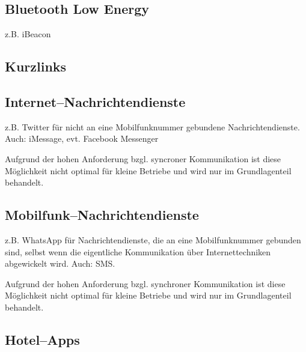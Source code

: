 \subsection{Bluetooth Low Energy}
z.B. iBeacon


\subsection{Kurzlinks}
\subsection{Internet--Nachrichtendienste}

z.B. Twitter für nicht an eine Mobilfunknummer gebundene Nachrichtendienste. Auch: iMessage, evt. Facebook Messenger

Aufgrund der hohen Anforderung bzgl. syncroner Kommunikation ist diese Möglichkeit nicht optimal für kleine Betriebe und wird nur im Grundlagenteil behandelt.

\subsection{Mobilfunk--Nachrichtendienste}

z.B. WhatsApp für Nachrichtendienste, die an eine Mobilfunknummer gebunden sind, selbst wenn die eigentliche Kommunikation über Internettechniken abgewickelt wird. Auch: SMS.

Aufgrund der hohen Anforderung bzgl. synchroner Kommunikation ist diese Möglichkeit nicht optimal für kleine Betriebe und wird nur im Grundlagenteil behandelt.



\subsection{Hotel--Apps}

